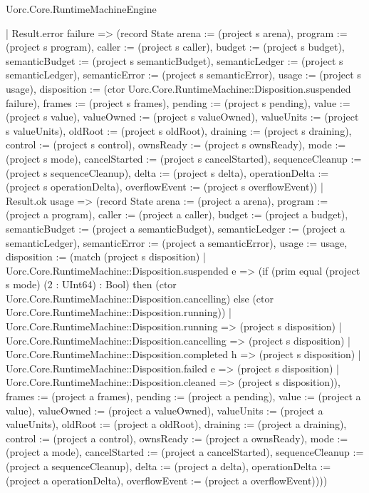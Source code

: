 \begin{lexlean}{Uorc.Core.RuntimeMachineEngine}
\begin{semanticmodule}
{      | Result.error failure => (record State {arena := (project s arena), program := (project s program), caller := (project s caller), budget := (project s budget), semanticBudget := (project s semanticBudget), semanticLedger := (project s semanticLedger), semanticError := (project s semanticError), usage := (project s usage), disposition := (ctor Uorc.Core.RuntimeMachine::Disposition.suspended failure), frames := (project s frames), pending := (project s pending), value := (project s value), valueOwned := (project s valueOwned), valueUnits := (project s valueUnits), oldRoot := (project s oldRoot), draining := (project s draining), control := (project s control), ownsReady := (project s ownsReady), mode := (project s mode), cancelStarted := (project s cancelStarted), sequenceCleanup := (project s sequenceCleanup), delta := (project s delta), operationDelta := (project s operationDelta), overflowEvent := (project s overflowEvent)})
      | Result.ok usage => (record State {arena := (project a arena), program := (project a program), caller := (project a caller), budget := (project a budget), semanticBudget := (project a semanticBudget), semanticLedger := (project a semanticLedger), semanticError := (project a semanticError), usage := usage, disposition := (match (project s disposition)
        | Uorc.Core.RuntimeMachine::Disposition.suspended e => (if (prim equal (project s mode) (2 : UInt64) : Bool) then (ctor Uorc.Core.RuntimeMachine::Disposition.cancelling) else (ctor Uorc.Core.RuntimeMachine::Disposition.running))
        | Uorc.Core.RuntimeMachine::Disposition.running => (project s disposition)
        | Uorc.Core.RuntimeMachine::Disposition.cancelling => (project s disposition)
        | Uorc.Core.RuntimeMachine::Disposition.completed h => (project s disposition)
        | Uorc.Core.RuntimeMachine::Disposition.failed e => (project s disposition)
        | Uorc.Core.RuntimeMachine::Disposition.cleaned => (project s disposition)), frames := (project a frames), pending := (project a pending), value := (project a value), valueOwned := (project a valueOwned), valueUnits := (project a valueUnits), oldRoot := (project a oldRoot), draining := (project a draining), control := (project a control), ownsReady := (project a ownsReady), mode := (project a mode), cancelStarted := (project a cancelStarted), sequenceCleanup := (project a sequenceCleanup), delta := (project a delta), operationDelta := (project a operationDelta), overflowEvent := (project a overflowEvent)})))
}
\end{semanticmodule}
\end{lexlean}
